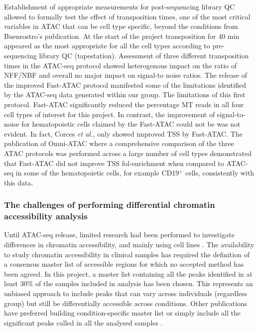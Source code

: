Establishment of appropriate measurements for post-sequencing library QC allowed to formally test the effect of transposition times, one of the most critical variables in ATAC that can be cell type specific, beyond the conditions from Buenrostro's publication. At the start of the project transposition for 40 min appeared as the most appropriate for all the cell types according to pre-sequencing library QC (tapestation). Assessment of three different transposition times in the ATAC-seq protocol showed heterogenous impact on the ratio of NFF/NBF and overall no major impact on signal-to noise ratios. The release of the improved Fast-ATAC protocol manifested some of the limitations identified by the ATAC-seq data generated within our group. The limitations of this first protocol. Fast-ATAC significantly reduced the percentage MT reads in all four cell types of interest for this project. In contrast, the improvement of signal-to-noise for hematopoietic cells claimed by the Fast-ATAC could not be was not evident. In fact, Corces \textit{et al.,} only showed improved TSS by Fast-ATAC. The publication of Omni-ATAC where a comprehensive comparison of the three ATAC protocols was performed across a large number of cell types demonstrated that Fast-ATAC did not improve TSS fol-enrichment when compared to ATAC-seq in some of the hematopoietic cells, for example CD19$^+$ cells, consistently with this data. 


\subsubsection{The challenges of performing differential chromatin accessibility analysis}
Until ATAC-seq release, limited research had been performed to investigate differences in chromatin accessibility, and mainly using cell lines \parencite{Degner2012}. The availability to study chromatin accessibility in clinical samples has required the definition of a consensus master list of accessible regions for which no accepted method has been agreed. In this project, a master list containing all the peaks identified in at least 30\% of the samples included in analysis has been chosen. This represents an unbiased approach to include peaks that can vary across individuals (regardless group) but still be differentially accessible across conditions. Other publications have preferred building condition-specific master list or simply include all the significant peaks called in all the analysed samples \parencite{Alasoo2018, Turner2018}. 

